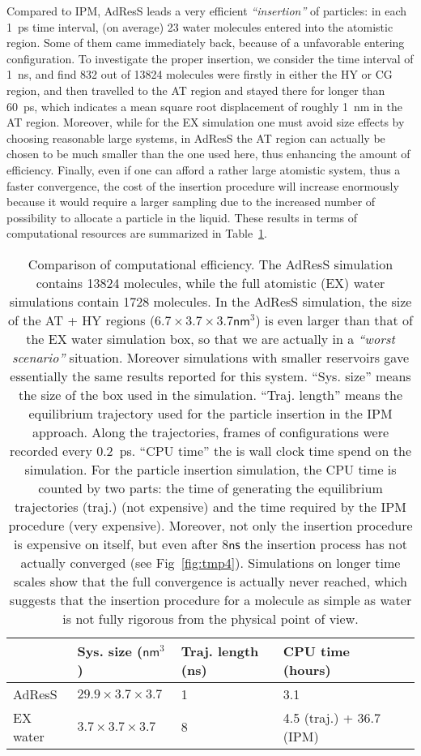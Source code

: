 \documentclass[aip,jcp,a4paper,reprint,onecolumn]{revtex4-1}
\begin{document}
Compared to IPM, AdResS leads a very
efficient {\it ``insertion''} of particles: in each 1~\textsf{ps} time interval,
(on average) 23 water molecules entered into the atomistic region. Some of
them came immediately back, because of a unfavorable entering
configuration.  To investigate the proper insertion, we consider the
time interval of 1~\textsf{ns}, and find 832 out of 13824 molecules
were firstly in either the HY or CG region, and then travelled to the
AT region and stayed there for longer than 60~\textsf{ps}, which
indicates a mean square root displacement of roughly 1~\textsf{nm}
in the AT region. Moreover, while for the EX simulation one must avoid size effects by choosing reasonable large systems, in AdResS the AT region can actually be chosen to be much smaller than the one used here, thus enhancing the amount of efficiency. Finally, even if one can afford a rather large atomistic system, thus a faster convergence, the cost of the insertion procedure will increase enormously because it would require a larger sampling due to the increased number of possibility to allocate a particle in the liquid. 
These results in terms of computational resources are summarized in Table~\ref{tab:tmp1}.
\begin{table}
  \centering
  \begin{tabular}{l|l|l|l|l}
    & Sys. size ($\textsf{nm}^3$)
    & Traj. length (\textsf{ns})
    & CPU time (hours)\\    \hline
    AdResS   &$29.9\times3.7\times3.7$ & 1 & 3.1\\
    EX water & $3.7\times3.7\times3.7$ & 8 & 4.5 (traj.) + 36.7 (IPM)\\
  \end{tabular}
  \caption{Comparison of computational efficiency.
      The AdResS simulation contains 13824 molecules, while the full atomistic (EX)
      water simulations contain 1728 molecules. In the AdResS simulation,
      the size of the AT + HY regions ($6.7\times3.7\times3.7\textsf{nm}^3$) is even larger than that of the EX water
      simulation box, so that we are actually in a {\it ``worst scenario''} situation. Moreover simulations with smaller reservoirs  gave essentially the same results reported for this system.
      ``Sys. size'' means the size of the box used in the simulation.
      ``Traj. length'' means the equilibrium trajectory
      used for the particle insertion in the IPM approach. Along the trajectories, frames
      of configurations were recorded every 0.2~\textsf{ps}.
      ``CPU time'' the is wall clock time spend on the simulation.
      For the particle insertion simulation, the CPU time is counted by two
      parts: the time of generating the equilibrium trajectories (traj.) (not expensive)
      and the time required by the IPM procedure (very expensive). Moreover, not only the insertion procedure is expensive on itself, but even after $8\textsf{ns}$ the insertion process has not actually converged (see Fig~\ref{fig:tmp4}). Simulations on longer time scales show that the full convergence is actually never reached, which suggests that the insertion procedure for a molecule as simple as water is not fully rigorous from the physical point of view.
    }
  \label{tab:tmp1}
\end{table}
\end{document}
